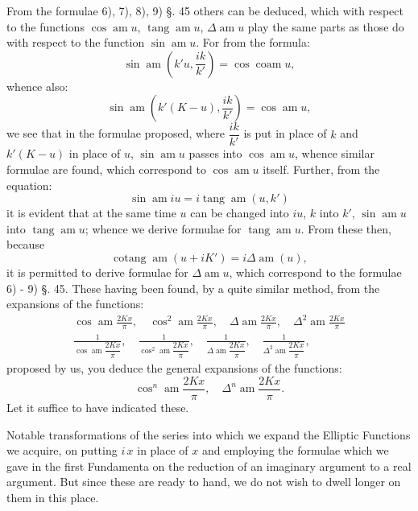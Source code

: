 \documentclass{article}
\begin{document}
From the formulae 6), 7), 8), 9) §. 45 others can be deduced, which with respect to the functions $\cos\operatorname{am}u$, $\operatorname{tang}\operatorname{am}u$, $\Delta\operatorname{am}u$ play the same parts as those do with respect to the function $\sin\operatorname{am}u$. For from the formula:
\[
\sin\operatorname{am}\left(k'u,\frac{ik}{k'}\right)=\cos\operatorname{coam}u,
\]
whence also:
\[
\sin\operatorname{am}\left(k'(K-u),\frac{ik}{k'}\right)=\cos\operatorname{am}u,
\]
we see that in the formulae proposed, where $\dfrac{ik}{k'}$ is put in place of $k$ and $k'(K-u)$ in place of $u$, $\sin\operatorname{am}u$ passes into $\cos\operatorname{am}u$, whence similar formulae are found, which correspond to $\cos\operatorname{am}u$ itself. Further, from the equation:
\[
\sin\operatorname{am}iu=i\operatorname{tang}\operatorname{am}(u,k')
\]
it is evident that at the same time $u$ can be changed into $iu$, $k$ into $k'$, $\sin\operatorname{am}u$ into $\operatorname{tang}\operatorname{am}u$; whence we derive formulae for $\operatorname{tang}\operatorname{am}u$. From these then, because
\[
\operatorname{cotang}\operatorname{am}(u+iK')=i\Delta\operatorname{am}(u),
\]
it is permitted to derive formulae for $\Delta\operatorname{am}u$, which correspond to the formulae 6) - 9) §. 45. These having been found, by a quite similar method, from the expansions of the functions:
\[
\begin{gathered}
\cos\operatorname{am}\frac{2Kx}{\pi},\quad\cos^{2}\operatorname{am}\frac{2Kx}{\pi},\quad\Delta\operatorname{am}\frac{2Kx}{\pi},\quad\Delta^{2}\operatorname{am}\frac{2Kx}{\pi}\\[1.5ex]
\frac{1}{\cos\operatorname{am}\dfrac{2Kx}{\pi}},\quad\frac{1}{\cos^{2}\operatorname{am}\dfrac{2Kx}{\pi}},\quad\frac{1}{\Delta\operatorname{am}\dfrac{2Kx}{\pi}},\quad\frac{1}{\Delta^{2}\operatorname{am}\dfrac{2Kx}{\pi}},
\end{gathered}
\]
proposed by us, you deduce the general expansions of the functions:
\[
\cos^{n}\operatorname{am}\frac{2Kx}{\pi},\quad\Delta^{n}\operatorname{am}\frac{2Kx}{\pi}.
\]
Let it suffice to have indicated these.


Notable transformations of the series into which we expand the Elliptic Functions we acquire, on putting $i\,x$ in place of $x$ and employing the formulae which we gave in the first Fundamenta on the reduction of an imaginary argument to a real argument. But since these are ready to hand, we do not wish to dwell longer on them in this place.
\end{document}
